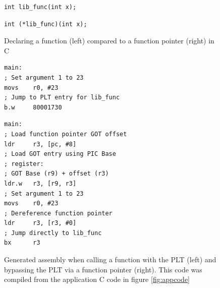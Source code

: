 \documentclass[12pt]{ucsddissertation}
\begin{document}
\begin{figure}[b]
 \begin{minipage}{0.47\textwidth}
  \centering
  \begin{verbatim}
int lib_func(int x);
  \end{verbatim}
     \caption[]{Traditional Function Declaration}
 \end{minipage}
 \begin{minipage}{0.47\textwidth}
  \centering
  \begin{verbatim}
int (*lib_func)(int x);
  \end{verbatim}
     \caption[]{Function Pointer Declaration}
 \end{minipage}
    \caption[Function Pointer Declaration]{Declaring a function (left) compared to a function pointer (right) in C}
    \label{fig:cfunctionpointer}
\end{figure}

\begin{figure}[t!]
 \begin{minipage}{0.45\textwidth}
  \centering
  \begin{verbatim}
main:
; Set argument 1 to 23
movs    r0, #23
; Jump to PLT entry for lib_func 
b.w     80001730
  \end{verbatim}
\caption[]{Calling a function without using function pointer which results in a jump to a PLT entry}
 \end{minipage}
\hspace{0.5cm}
 \begin{minipage}{0.45\textwidth}
  \centering
  \begin{verbatim}
main:
; Load function pointer GOT offset
ldr     r3, [pc, #8] 
; Load GOT entry using PIC Base 
; register:
; GOT Base (r9) + offset (r3)
ldr.w   r3, [r9, r3]
; Set argument 1 to 23
movs    r0, #23
; Dereference function pointer
ldr     r3, [r3, #0]
; Jump directly to lib_func 
bx      r3
  \end{verbatim}
     \caption[]{Calling a function with a function pointer. Accesses value of function pointer via GOT, dereferences pointer and makes the jump.}
 \end{minipage}
    \caption[Bypassing PLT with Function Pointers]{Generated assembly when calling a function with the PLT (left) and bypassing the PLT via a function pointer (right). This code was compiled from the application C code in figure \ref{fig:appcode}}
    \label{fig:asmfunctionpointer}
\end{figure}
\end{document}
